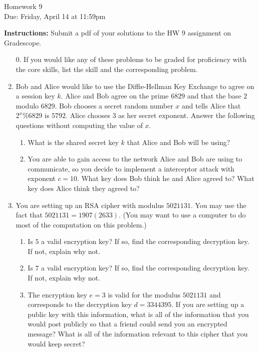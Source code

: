 \documentclass[12pt]{article}
\begin{document}
\begin{center}
{\Large Homework 9}\\
Due: Friday,  April 14 at 11:59pm\\


\end{center}
{\bf Instructions:} Submit a pdf of your solutions to the HW 9 assignment on Gradescope.  



\begin{enumerate}
\item[0.] If you would like any of these problems to be graded for proficiency with the core skills, list the skill and the corresponding problem. 

\item Bob and Alice would like to use the Diffie-Hellman Key Exchange to agree on a session key $k$. Alice and Bob agree on the prime $6829$ and that the base $2$ modulo $6829$. Bob chooses a secret random number $x$ and tells Alice that $2^x\%6829$ is $5792$. Alice chooses $3$ as her secret exponent.  Answer the following questions without computing the value of $x$. 
\begin{enumerate}
\item What is the shared secret key $k$ that Alice and Bob will be using?
\item You are able to gain access to the network Alice and Bob are using to communicate, so you decide to implement a interceptor attack with exponent $c=10$. What key does Bob think he and Alice agreed to? What key does Alice think they agreed to?
\end{enumerate}	

\item You are setting up an RSA cipher with modulus $5021131$.  You may use the fact that $5021131 = 1907(2633)$.  (You may want to use a computer to do most of the computation on this problem.)
\begin{enumerate}
\item Is $5$ a valid encryption key?  If so, find the corresponding decryption key.  If not, explain why not.

\item Is $7$ a valid encryption key?  If so, find the corresponding decryption key.  If not, explain why not.

\item The encryption key $e = 3$ is valid for the modulus $5021131$ and corresponds to the decryption key $d = 3344395$.  If you are setting up a public key with this information, what is all of the information that you would post publicly so that a friend could send you an encrypted message?  What is all of the information relevant to this cipher that you would keep secret?



\end{enumerate}
\end{enumerate}
\end{document}
